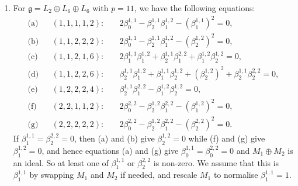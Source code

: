 \documentclass[11pt,a4paper,reqno]{amsart}
\theoremstyle{definition}
\numberwithin{equation}{section}
\newcommand{\fg}{\mathfrak{g}}
\begin{document}
\begin{enumerate}
\item For $\fg=L_2\oplus L_6\oplus L_6$ with $p=11$, we have the following equations:
\begin{align*}
\text{(a)}&&(1,1,1,1,2):\quad&\textstyle 2\beta^{1,1}_0-\beta^{1,1}_2\beta^{1,2}_1-(\beta^{1,1}_1)^2=0,\\
\text{(b)}&&(1,1,2,2,2):\quad&\textstyle 2\beta^{1,1}_0-\beta^{1,1}_2\beta^{1,2}_1-(\beta^{1,2}_2)^2=0,\\
\text{(c)}&&(1,1,2,1,6):\quad&\textstyle 2\beta^{1,1}_1\beta^{1,2}_1+\beta^{1,1}_2\beta^{2,2}_1+\beta^{1,2}_1\beta^{1,2}_2=0,\\
\text{(d)}&&(1,1,2,2,6):\quad&\textstyle \beta^{1,1}_2\beta^{1,2}_1+\beta^{1,1}_1\beta^{1,2}_2+(\beta^{1,2}_2)^2+\beta^{1,1}_2\beta^{2,2}_2=0,\\
\text{(e)}&&(1,2,2,2,4):\quad&\textstyle \beta^{1,1}_2\beta^{2,2}_1-\beta^{1,2}_1\beta^{1,2}_2=0,\\
\text{(f)}&&(2,2,1,1,2):\quad&\textstyle 2\beta^{2,2}_0-\beta^{1,2}_2\beta^{2,2}_1-(\beta^{1,2}_1)^2=0,\\
\text{(g)}&&(2,2,2,2,2):\quad&\textstyle 2\beta^{2,2}_0-\beta^{1,2}_2\beta^{2,2}_1-(\beta^{2,2}_2)^2=0.
\end{align*}
If $\beta^{1,1}_1=\beta^{2,2}_2=0$, then (a) and (b) give $\beta^{1,2}_2=0$ while (f) and (g) give $\beta^{1,2}_1=0$, and hence equations (a) and (g) give $\beta^{1,1}_0=\beta^{2,2}_0=0$ and $M_1\oplus M_2$ is an ideal. So at least one of $\beta^{1,1}_1$ or $\beta^{2,2}_2$ is non-zero. We assume that this is $\beta^{1,1}_1$ by swapping $M_1$ and $M_2$ if needed, and rescale $M_1$ to normalise $\beta^{1,1}_1=1$.


\end{enumerate}
\end{document}
